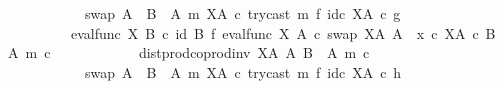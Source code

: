 \begin{isabellebody}
\ \ \ \ \ \ \ \ \ \ \ \ swap\ {\isacharparenleft}{\kern0pt}A\ {\isasymCoprod}\ {\isacharparenleft}{\kern0pt}B\ {\isasymsetminus}\ {\isacharparenleft}{\kern0pt}A{\isacharcomma}{\kern0pt}\ m{\isacharparenright}{\kern0pt}{\isacharparenright}{\kern0pt}{\isacharparenright}{\kern0pt}\ {\isacharparenleft}{\kern0pt}X\isactrlbsup A\isactrlesup {\isacharparenright}{\kern0pt}\ {\isasymcirc}\isactrlsub c\ try{\isacharunderscore}{\kern0pt}cast\ m\ {\isasymtimes}\isactrlsub f\ id\isactrlsub c\ {\isacharparenleft}{\kern0pt}X\isactrlbsup A\isactrlesup {\isacharparenright}{\kern0pt}{\isacharparenright}{\kern0pt}\isactrlsup {\isasymsharp}\ {\isasymcirc}\isactrlsub c\ g{\isacharparenright}{\kern0pt}{\isacharparenright}{\kern0pt}\ {\isacharequal}{\kern0pt}\ \isanewline
\ \ \ \ \ \ \ \ \ \ {\isacharparenleft}{\kern0pt}eval{\isacharunderscore}{\kern0pt}func\ X\ B{\isacharparenright}{\kern0pt}\ {\isasymcirc}\isactrlsub c\ {\isacharparenleft}{\kern0pt}id\ B\ {\isasymtimes}\isactrlsub f\ {\isacharparenleft}{\kern0pt}{\isacharparenleft}{\kern0pt}{\isacharparenleft}{\kern0pt}eval{\isacharunderscore}{\kern0pt}func\ X\ A\ {\isasymcirc}\isactrlsub c\ swap\ {\isacharparenleft}{\kern0pt}X\isactrlbsup A\isactrlesup {\isacharparenright}{\kern0pt}\ A{\isacharparenright}{\kern0pt}\ {\isasymamalg}\ {\isacharparenleft}{\kern0pt}x\ {\isasymcirc}\isactrlsub c\ {\isasymbeta}\isactrlbsub X\isactrlbsup A\isactrlesup \ {\isasymtimes}\isactrlsub c\ {\isacharparenleft}{\kern0pt}B\ {\isasymsetminus}\ {\isacharparenleft}{\kern0pt}A{\isacharcomma}{\kern0pt}\ m{\isacharparenright}{\kern0pt}{\isacharparenright}{\kern0pt}\isactrlesub {\isacharparenright}{\kern0pt}\ {\isasymcirc}\isactrlsub c\isanewline
\ \ \ \ \ \ \ \ \ \ \ \ dist{\isacharunderscore}{\kern0pt}prod{\isacharunderscore}{\kern0pt}coprod{\isacharunderscore}{\kern0pt}inv\ {\isacharparenleft}{\kern0pt}X\isactrlbsup A\isactrlesup {\isacharparenright}{\kern0pt}\ A\ {\isacharparenleft}{\kern0pt}B\ {\isasymsetminus}\ {\isacharparenleft}{\kern0pt}A{\isacharcomma}{\kern0pt}\ m{\isacharparenright}{\kern0pt}{\isacharparenright}{\kern0pt}\ {\isasymcirc}\isactrlsub c\isanewline
\ \ \ \ \ \ \ \ \ \ \ \ swap\ {\isacharparenleft}{\kern0pt}A\ {\isasymCoprod}\ {\isacharparenleft}{\kern0pt}B\ {\isasymsetminus}\ {\isacharparenleft}{\kern0pt}A{\isacharcomma}{\kern0pt}\ m{\isacharparenright}{\kern0pt}{\isacharparenright}{\kern0pt}{\isacharparenright}{\kern0pt}\ {\isacharparenleft}{\kern0pt}X\isactrlbsup A\isactrlesup {\isacharparenright}{\kern0pt}\ {\isasymcirc}\isactrlsub c\ try{\isacharunderscore}{\kern0pt}cast\ m\ {\isasymtimes}\isactrlsub f\ id\isactrlsub c\ {\isacharparenleft}{\kern0pt}X\isactrlbsup A\isactrlesup {\isacharparenright}{\kern0pt}{\isacharparenright}{\kern0pt}\isactrlsup {\isasymsharp}\ {\isasymcirc}\isactrlsub c\ h{\isacharparenright}{\kern0pt}{\isacharparenright}{\kern0pt}{\isachardoublequoteclose}\isanewline

\end{isabellebody}
